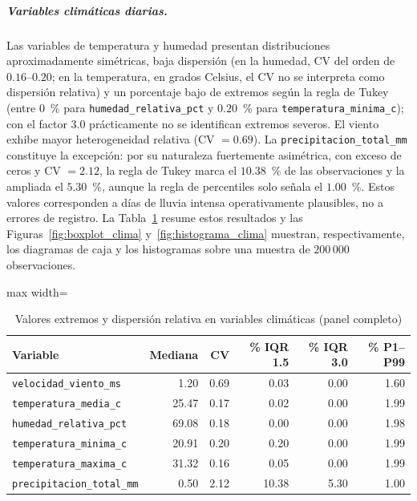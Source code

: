     \subparagraph{Variables climáticas diarias.} Las variables de temperatura y humedad presentan distribuciones aproximadamente simétricas, baja dispersión (en la humedad, CV del orden de $0{.}16$--$0{.}20$; en la temperatura, en grados Celsius, el CV no se interpreta como dispersión relativa) y un porcentaje bajo de extremos según la regla de Tukey (entre $0$~\% para \texttt{humedad\_relativa\_pct} y $0{.}20$~\% para \texttt{temperatura\_minima\_c}); con el factor $3{.}0$ prácticamente no se identifican extremos severos. El viento exhibe mayor heterogeneidad relativa (CV $= 0{.}69$). La \texttt{precipitacion\_total\_mm} constituye la excepción: por su naturaleza fuertemente asimétrica, con exceso de ceros y CV $= 2{.}12$, la regla de Tukey marca el $10{.}38$~\% de las observaciones y la ampliada el $5{.}30$~\%, aunque la regla de percentiles solo señala el $1{.}00$~\%. Estos valores corresponden a días de lluvia intensa operativamente plausibles, no a errores de registro. La Tabla~\ref{tab:extremos_clima} resume estos resultados y las Figuras~\ref{fig:boxplot_clima} y~\ref{fig:histograma_clima} muestran, respectivamente, los diagramas de caja y los histogramas sobre una muestra de $200\,000$ observaciones.

\begin{table}[!htbp]
\centering
\small
    \caption{Valores extremos y dispersión relativa en variables climáticas (panel completo)}
    \label{tab:extremos_clima}
    \begin{adjustbox}{max width=\linewidth}
\begin{tabular}{l r r r r r}
\toprule
    \textbf{Variable} & \textbf{Mediana} & \textbf{CV} & \textbf{\% IQR 1.5} & \textbf{\% IQR 3.0} & \textbf{\% P1--P99} \\
\midrule
    \texttt{velocidad\_viento\_ms}   & 1.20  & 0.69 & 0.03  & 0.00 & 1.60 \\
    \texttt{temperatura\_media\_c}   & 25.47 & 0.17 & 0.02  & 0.00 & 1.99 \\
    \texttt{humedad\_relativa\_pct}  & 69.08 & 0.18 & 0.00  & 0.00 & 1.98 \\
    \texttt{temperatura\_minima\_c}  & 20.91 & 0.20 & 0.20  & 0.00 & 1.99 \\
    \texttt{temperatura\_maxima\_c}  & 31.32 & 0.16 & 0.05  & 0.00 & 1.99 \\
    \texttt{precipitacion\_total\_mm} & 0.50 & 2.12 & 10.38 & 5.30 & 1.00 \\
    \bottomrule
    \end{tabular}
\end{adjustbox}
    \end{table}
    

